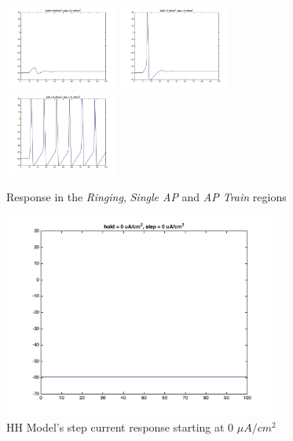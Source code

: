 \documentclass{beamer}
\begin{document}
\begin{frame}
  \begin{figure}
    \centering
    \includegraphics[width = 0.33\textwidth]{./images/current_0_2p4.jpg}
    \includegraphics[width = 0.33\textwidth]{./images/current_0_3.jpg}
    \includegraphics[width = 0.33\textwidth]{./images/current_0_10.jpg}
    \caption{Response in the \emph{Ringing}, \emph{Single AP} and \emph{AP Train} regions}
  \end{figure}
\end{frame}

\begin{frame}
  \begin{figure}
    \centering
    \includegraphics[width = 0.8\textwidth]{./images/current_0_0.jpg}
    \caption{HH Model's step current response starting at 0 $\mu A/cm^2$}
  \end{figure}
\end{frame}
\end{document}
